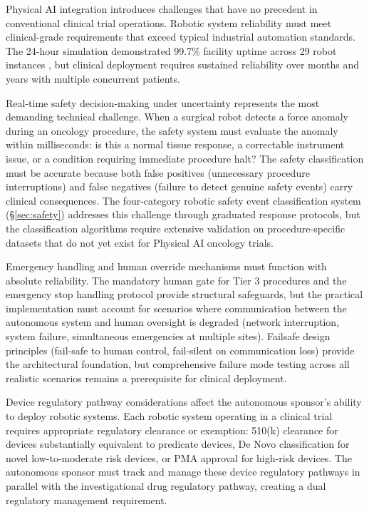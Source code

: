 Physical AI integration introduces challenges that have no precedent in conventional
clinical trial operations. Robotic system reliability must meet clinical-grade requirements
that exceed typical industrial automation standards. The 24-hour simulation demonstrated
99.7\% facility uptime across 29 robot instances \cite{main-repo}, but clinical deployment
requires sustained reliability over months and years with multiple concurrent patients.

Real-time safety decision-making under uncertainty represents the most demanding technical
challenge. When a surgical robot detects a force anomaly during an oncology procedure, the
safety system must evaluate the anomaly within milliseconds: is this a normal tissue
response, a correctable instrument issue, or a condition requiring immediate procedure
halt? The safety classification must be accurate because both false positives (unnecessary
procedure interruptions) and false negatives (failure to detect genuine safety events)
carry clinical consequences. The four-category robotic safety event classification system
(\S\ref{sec:safety}) addresses this challenge through graduated response protocols, but
the classification algorithms require extensive validation on procedure-specific datasets
that do not yet exist for Physical AI oncology trials.

Emergency handling and human override mechanisms must function with absolute reliability.
The mandatory human gate for Tier 3 procedures and the emergency stop handling protocol
provide structural safeguards, but the practical implementation must account for scenarios
where communication between the autonomous system and human oversight is degraded (network
interruption, system failure, simultaneous emergencies at multiple sites). Failsafe design
principles (fail-safe to human control, fail-silent on communication loss) provide the
architectural foundation, but comprehensive failure mode testing across all realistic
scenarios remains a prerequisite for clinical deployment.

Device regulatory pathway considerations affect the autonomous sponsor's ability to deploy
robotic systems. Each robotic system operating in a clinical trial requires appropriate
regulatory clearance or exemption: 510(k) clearance for devices substantially equivalent
to predicate devices, De Novo classification for novel low-to-moderate risk devices, or
PMA approval for high-risk devices. The autonomous sponsor must track and manage these
device regulatory pathways in parallel with the investigational drug regulatory pathway,
creating a dual regulatory management requirement.

